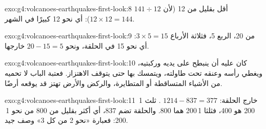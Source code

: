 \begin{solution}{exo:g4:volcanoes-earthquakes-first-look:8}
$141 \div 12$ أقل بقليل من 12 (لأن $12 \times 12 = 144$): أي نحو
12  كبيرًا في الشهر.
\end{solution}

\begin{solution}{exo:g4:volcanoes-earthquakes-first-look:9}
من 20، الربع 5، فثلاثة الأرباع $3 \times 5 = 15$: أي نحو 15
في الحلقة، ونحو $20 - 15 = 5$ خارجها.
\end{solution}

\begin{solution}{exo:g4:volcanoes-earthquakes-first-look:10}
كان عليه أن ينبطح على يديه وركبتيه، ويغطي رأسه وعنقه تحت طاولته، ويتمسك
بها حتى يتوقف الاهتزاز. فعتبة الباب لا تحميه من الأشياء المتساقطة أو
المتطايرة، والركض والأرض تهتز قد يوقعه
أرضًا.
\end{solution}

\begin{solution}{exo:g4:volcanoes-earthquakes-first-look:11}
خارج الحلقة: $1214 - 837 = 377$ . ثلث 1\,200 هو 400، فثلثا
1\,200 هما 800. والحلقة تضم 837، أي أكثر بقليل من 800 من نحو
1\,200: فعبارة «نحو 2 من كل 3» وصف جيد.
\end{solution}
